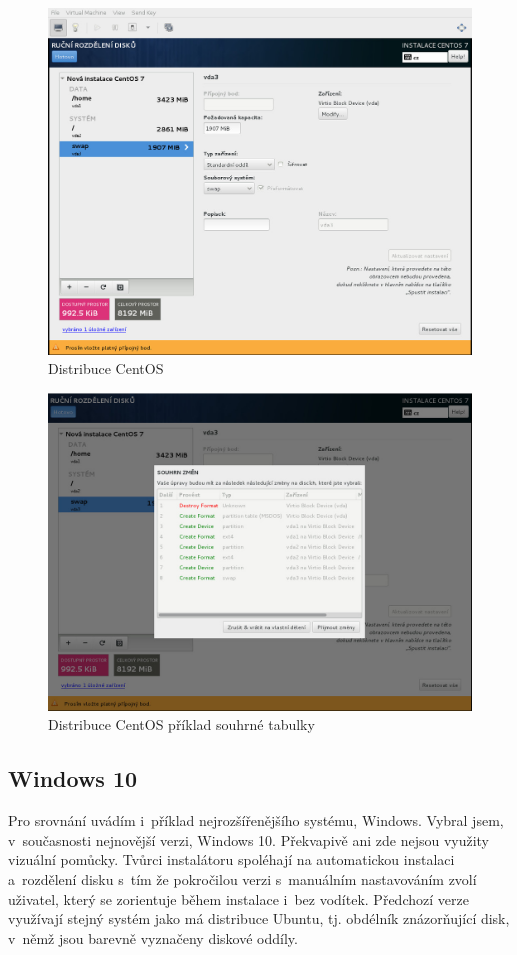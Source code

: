 \documentclass[a4paper,twosided]{article}
\begin{document}
\begin{figure}[hb]
\label{fig:centos1}
\caption{Distribuce CentOS}
\centering
\includegraphics[width=.8\columnwidth]{pics/centos1.jpg}
\end{figure}

\begin{figure}[hb]
\label{fig:centos2}
\caption{Distribuce CentOS příklad souhrné tabulky}
\centering
\includegraphics[width=.8\columnwidth]{pics/centos3.jpg}
\end{figure}

\subsection{Windows 10}

Pro srovnání uvádím i~příklad nejrozšířenějšího systému, Windows. Vybral jsem, v~současnosti nejnovější verzi, Windows 10. Překvapivě ani zde nejsou využity vizuální pomůcky.
Tvůrci instalátoru spoléhají na automatickou instalaci a~rozdělení disku s~tím že pokročilou verzi s~manuálním nastavováním zvolí uživatel, který se zorientuje během instalace i~bez vodítek. Předchozí verze využívají stejný systém jako má distribuce Ubuntu, tj. obdélník znázorňující disk, v~němž jsou barevně vyznačeny diskové oddíly.
\end{document}
